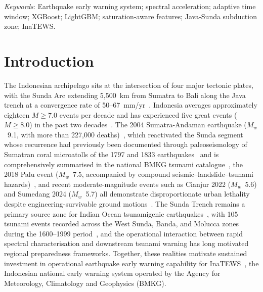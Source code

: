\documentclass[10pt]{article}
\renewcommand{\cite}[1]{\citep{#1}}
\newcommand{\jetKeywords}[1]{%
  \begin{list}{}{\leftmargin=0.25in \rightmargin=0.25in
                 \topsep=0pt \parsep=0pt}\item[]%
  \fontsize{8}{10}\selectfont\textit{Keywords}: #1
  \end{list}\vspace{1em}}
\begin{document}
\jetKeywords{Earthquake early warning system; spectral acceleration;
adaptive time window; XGBoost; LightGBM; saturation-aware features;
Java-Sunda subduction zone; InaTEWS.}

\section{Introduction}

The Indonesian archipelago sits at the intersection of four major tectonic plates, with the Sunda Arc extending 5,500~km from Sumatra to Bali along the Java trench at a convergence rate of 50--67~mm/yr~\cite{ref2}. Indonesia averages approximately eighteen $M \geq 7.0$ events per decade and has experienced five great events ($M \geq 8.0$) in the past two decades~\cite{BMKG2026}. The 2004 Sumatra-Andaman earthquake ($M_w$~9.1, with more than 227{,}000 deaths)~\cite{ref4, jetSatake2020, NatawidjajaSieh2006, SetiyonoBMKG2019}, which reactivated the Sunda segment whose recurrence had previously been documented through paleoseismology of Sumatran coral microatolls of the 1797 and 1833 earthquakes~\cite{NatawidjajaSieh2006} and is comprehensively summarised in the national BMKG tsunami catalogue~\cite{SetiyonoBMKG2019}, the 2018 Palu event ($M_w$~7.5, accompanied by compound seismic--landslide--tsunami hazards)~\cite{ref6}, and recent moderate-magnitude events such as Cianjur 2022 ($M_w$~5.6) and Sumedang 2024 ($M_w$~5.7) all demonstrate disproportionate urban lethality despite engineering-survivable ground motions~\cite{jetMukhlisin2023}. The Sunda Trench remains a primary source zone for Indian Ocean tsunamigenic earthquakes~\cite{LatiefPuspitoImamura2000, jetSrivastava2008}, with 105 tsunami events recorded across the West Sunda, Banda, and Molucca zones during the 1600--1999 period~\cite{LatiefPuspitoImamura2000}, and the operational interaction between rapid spectral characterisation and downstream tsunami warning has long motivated regional preparedness frameworks. Together, these realities motivate sustained investment in operational earthquake early warning capability for InaTEWS~\cite{jetSubekti2022, jetPribadi2023}, the Indonesian national early warning system operated by the Agency for Meteorology, Climatology and Geophysics (BMKG).
\end{document}
